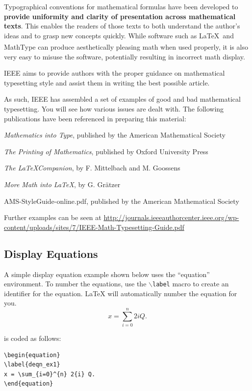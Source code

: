 \documentclass[lettersize,journal]{IEEEtran}
\begin{document}
\noindent Typographical conventions for mathematical formulas have been developed to {\bf provide uniformity and clarity of presentation across mathematical texts}. This enables the readers of those texts to both understand the author's ideas and to grasp new concepts quickly. While software such as \LaTeX \ and MathType\textsuperscript{\textregistered} can produce aesthetically pleasing math when used properly, it is also very easy to misuse the software, potentially resulting in incorrect math display.

IEEE aims to provide authors with the proper guidance on mathematical typesetting style and assist them in writing the best possible article.

As such, IEEE has assembled a set of examples of good and bad mathematical typesetting. You will see how various issues are dealt with. The following publications have been referenced in preparing this material:

\begin{list}{}{}
\item{\emph{Mathematics into Type}, published by the American Mathematical Society}
\item{\emph{The Printing of Mathematics}, published by Oxford University Press}
\item{\emph{The \LaTeX Companion}, by F. Mittelbach and M. Goossens}
\item{\emph{More Math into LaTeX}, by G. Gr\"atzer}
\item{AMS-StyleGuide-online.pdf, published by the American Mathematical Society}
\end{list}

Further examples can be seen at \url{http://journals.ieeeauthorcenter.ieee.org/wp-content/uploads/sites/7/IEEE-Math-Typesetting-Guide.pdf}

\subsection{Display Equations}
\noindent A simple display equation example shown below uses the ``equation'' environment. To number the equations, use the $\backslash${\tt{label}} macro to create an identifier for the equation. LaTeX will automatically number the equation for you.
\begin{equation}
\label{deqn_ex1}
x = \sum_{i=0}^{n} 2{i} Q.
\end{equation}

\noindent is coded as follows:
\begin{verbatim}
\begin{equation}
\label{deqn_ex1}
x = \sum_{i=0}^{n} 2{i} Q.
\end{equation}
\end{verbatim}
\end{document}
